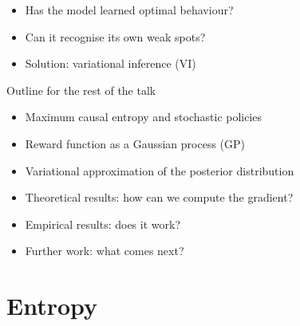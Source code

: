 \documentclass{beamer}
\begin{document}
\begin{frame}
  \begin{itemize}
  \item Has the model learned optimal behaviour?
  \item Can it recognise its own weak spots?
  \item Solution: variational inference (VI)
  \end{itemize}
  \pause
  \begin{block}{Outline for the rest of the talk}
  \begin{itemize}
  \item Maximum causal entropy and stochastic policies
  \item Reward function as a Gaussian process (GP)
  \item Variational approximation of the posterior distribution
  \item Theoretical results: how can we compute the gradient?
  \item Empirical results: does it work?
  \item Further work: what comes next?
  \end{itemize}
  \end{block}
\end{frame}

\section{Entropy}
\end{document}
